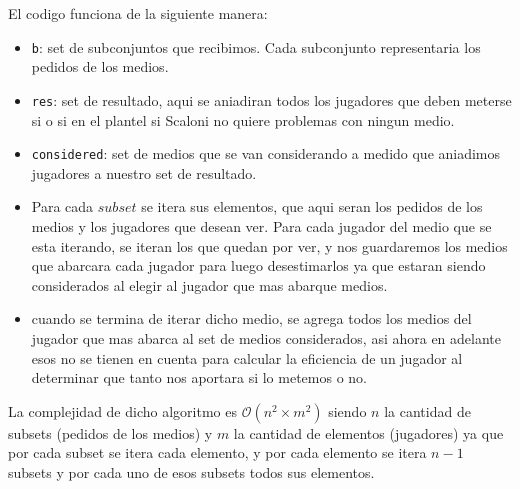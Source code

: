 El codigo funciona de la siguiente manera:
\begin{itemize}
    \item \texttt{b}: set de subconjuntos que recibimos. Cada subconjunto representaria los pedidos de los medios.
    \item \texttt{res}: set de resultado, aqui se aniadiran todos los jugadores que deben meterse si o si en el plantel si Scaloni no quiere problemas con ningun medio.
    \item \texttt{considered}: set de medios que se van considerando a medido que aniadimos jugadores a nuestro set de resultado.
    \item Para cada $subset$ se itera sus elementos, que aqui seran los pedidos de los medios y los jugadores que desean ver. Para cada jugador del medio que se esta iterando, se iteran los que quedan por ver, y nos guardaremos los medios que abarcara cada jugador para luego desestimarlos ya que estaran siendo considerados al elegir al jugador que mas abarque medios.
    \item cuando se termina de iterar dicho medio, se agrega todos los medios del jugador que mas abarca al set de medios considerados, asi ahora en adelante esos no se tienen en cuenta para calcular la eficiencia de un jugador al determinar que tanto nos aportara si lo metemos o no.
\end{itemize}

La complejidad de dicho algoritmo es $\mathcal{O}\left(n^2 \times m^2\right)$ siendo $n$ la cantidad de subsets (pedidos de los medios) y $m$ la cantidad de elementos (jugadores) ya que por cada subset se itera cada elemento, y por cada elemento se itera $n-1$ subsets y por cada uno de esos subsets todos sus elementos.